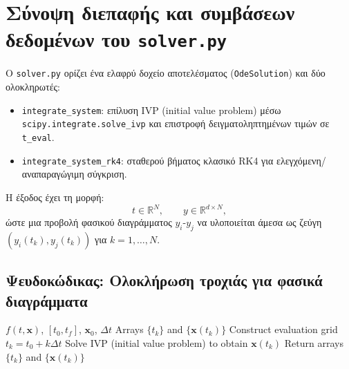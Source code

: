 \documentclass[11pt,a4paper]{report}
\begin{document}
\section{Σύνοψη διεπαφής και συμβάσεων δεδομένων του \texttt{solver.py}}
\label{app:solver-interface}
\begin{importantbox}
Ο \texttt{solver.py} ορίζει ένα ελαφρύ δοχείο αποτελέσματος (\texttt{OdeSolution}) και δύο ολοκληρωτές:
\begin{itemize}
  \item \texttt{integrate\_system}: επίλυση IVP (initial value problem) μέσω \texttt{scipy.integrate.solve\_ivp} και επιστροφή δειγματοληπτημένων τιμών σε \texttt{t\_eval}.
  \item \texttt{integrate\_system\_rk4}: σταθερού βήματος κλασικό RK4 για ελεγχόμενη/αναπαραγώγιμη σύγκριση.
\end{itemize}
Η έξοδος έχει τη μορφή:
\begin{equation*}
t \in \mathbb{R}^{N}, \qquad y \in \mathbb{R}^{d \times N},
\end{equation*}
ώστε μια προβολή φασικού διαγράμματος $y_i$-$y_j$ να υλοποιείται άμεσα ως ζεύγη $(y_i(t_k),y_j(t_k))$ για $k=1,\dots,N$.
\end{importantbox}

\subsection*{Ψευδοκώδικας: Ολοκλήρωση τροχιάς για φασικά διαγράμματα}
\begin{algorithm}[H]
\caption{Trajectory integration for phase portraits}
\label{alg:traj-phase}
\begin{tcolorbox}[appendixalgobox]
\begin{algorithmic}[1]
\Require $f(t,\mathbf{x})$, $[t_0,t_f]$, $\mathbf{x}_0$, $\Delta t$
\Ensure Arrays $\{t_k\}$ and $\{\mathbf{x}(t_k)\}$
\State Construct evaluation grid $t_k = t_0 + k\Delta t$
\State Solve IVP (initial value problem) to obtain $\mathbf{x}(t_k)$
\State Return arrays $\{t_k\}$ and $\{\mathbf{x}(t_k)\}$
\end{algorithmic}
\end{tcolorbox}
\end{algorithm}
\end{document}
